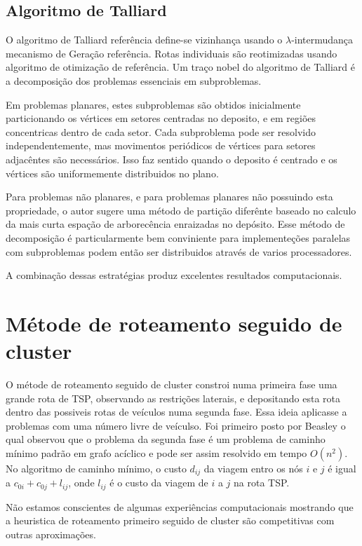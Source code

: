 \documentclass[a4paper, 12pt]{article}
\begin{document}
\subsection{Algoritmo de Talliard}

 O algoritmo de Talliard {\color{red} referência} define-se vizinhança usando o
$\lambda$-intermudança mecanismo de Geração {\color{red} referência}. Rotas individuais são
reotimizadas usando algoritmo de otimização de {\color{red} referência}. Um traço nobel do algoritmo
de Talliard é a decomposição dos problemas essenciais em subproblemas.

 Em problemas planares, estes subproblemas são obtidos inicialmente particionando os vértices em
setores centradas no deposito, e em regiões concentricas dentro de cada setor. Cada subproblema pode
ser resolvido independentemente, mas movimentos periódicos de vértices para setores adjacêntes são
necessários. Isso faz sentido quando o deposito é centrado e os vértices são uniformemente
distribuidos no plano.

 Para problemas não planares, e para problemas planares não possuindo esta propriedade, o autor
sugere uma método de partição diferênte baseado no calculo da mais curta espação de arborecência
enraizadas no depósito. Esse método de decomposição é particularmente bem conviniente para
implementeções paralelas com subproblemas podem então ser distribuidos através de varios
processadores.

 A combinação dessas estratégias produz excelentes resultados computacionais.

\section{Métode de roteamento seguido de cluster}

 O métode de roteamento seguido de cluster constroi numa primeira fase uma grande rota de TSP,
observando as restrições laterais, e depositando esta rota dentro das possiveis rotas de veículos
numa segunda fase. Essa ideia aplicasse a problemas com uma número livre de veículso. Foi primeiro
posto por Beasley o qual observou que o problema da segunda fase é um problema de caminho mínimo
padrão em grafo acíclico e pode ser assim resolvido em tempo $O(n^2)$. No algoritmo de caminho
mínimo, o custo $d_{ij}$ da viagem entro os nós $i$ e $j$ é igual a $c_{0i}+c_{0j}+l_{ij}$, onde
$l_{ij}$ é o custo da viagem de $i$ a $j$ na rota TSP.

 Não estamos conscientes de algumas experiências computacionais mostrando que a heuristica de
roteamento primeiro seguido de cluster são competitivas com outras aproximações.
\end{document}
